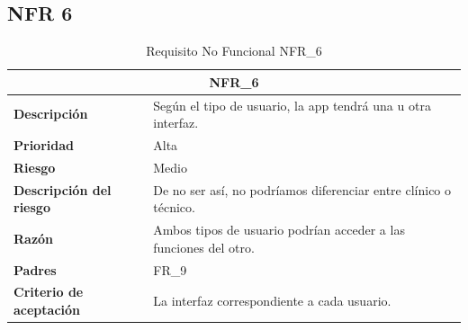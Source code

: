 \documentclass{scrreprt}
\begin{document}
\subsection{NFR 6}
    \begin{table}[H]
        \label{tab:my-table}
        \begin{tabular}{|p{5cm}|p{11cm}|}
        \hline
        \multicolumn{2}{|c|}{\textbf{NFR_6}} \\
        \hline
        \textbf{Descripción  }                      &  Según el tipo de usuario, la app tendrá una u otra interfaz.                                                                      \\ \hline
        \textbf{Prioridad}                          & Alta                                                                                              \\ \hline
        \textbf{Riesgo}                          & Medio                                                                                                \\ \hline
        \textbf{Descripción del riesgo}                    &  De no ser así, no podríamos diferenciar entre clínico o técnico.                          \\ \hline
        \textbf{Razón}                   & Ambos tipos de usuario podrían acceder a las funciones del otro.                                                                                                                       \\ \hline
        \textbf{Padres}                               &  FR_9\\  \hline
         \textbf{Criterio de aceptación}                    & La interfaz correspondiente a cada usuario.  \\ \hline
        \end{tabular}%
        
        \caption{Requisito No Funcional NFR_6}
\end{table}
\end{document}
